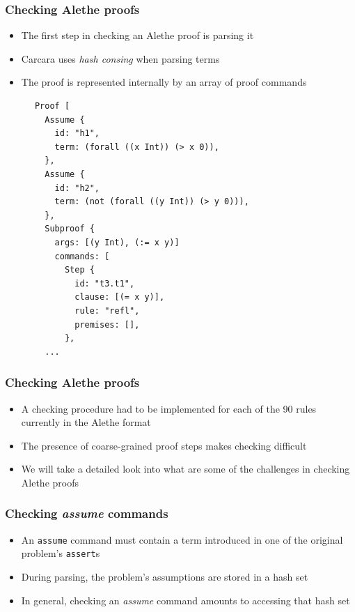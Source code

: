 \documentclass[usepdftitle=false,aspectratio=169]{beamer}
\newcommand\vitem{\vfill\item}
\begin{document}
\begin{frame}[fragile]
  \frametitle{Checking Alethe proofs}
  \begin{minipage}[c][0.6 \textheight]{0.49 \textwidth}
  \begin{itemize}
    \item The first step in checking an Alethe proof is parsing it
    \vitem Carcara uses \textit{hash consing} when parsing terms
    \vitem The proof is represented internally by an array of proof commands
  \end{itemize}
  \end{minipage}
  \begin{minipage}{0.5 \textwidth}
    \vspace{-.35ex}
    \begin{verbatim}
      Proof [
        Assume {
          id: "h1",
          term: (forall ((x Int)) (> x 0)),
        },
        Assume {
          id: "h2",
          term: (not (forall ((y Int)) (> y 0))),
        },
        Subproof {
          args: [(y Int), (:= x y)]
          commands: [
            Step {
              id: "t3.t1",
              clause: [(= x y)],
              rule: "refl",
              premises: [],
            },
        ...
    \end{verbatim}
  \end{minipage}
\end{frame}

\begin{frame}
  \frametitle{Checking Alethe proofs}
  \begin{itemize}
    \item A checking procedure had to be implemented for each of the 90 rules
    currently in the Alethe format
    \vitem The presence of coarse-grained proof steps makes checking difficult
    \vitem We will take a detailed look into what are some of the challenges in
    checking Alethe proofs
  \end{itemize}
\end{frame}

\begin{frame}
  \frametitle{Checking \textit{assume} commands}
  \begin{itemize}
    \item An \texttt{assume} command must contain a term introduced in one of the
    original problem's \texttt{assert}s
    \vitem During parsing, the problem's assumptions are stored in a hash set
    \vitem In general, checking an \textit{assume} command amounts to accessing
    that hash set
  \end{itemize}
\end{frame}
\end{document}
